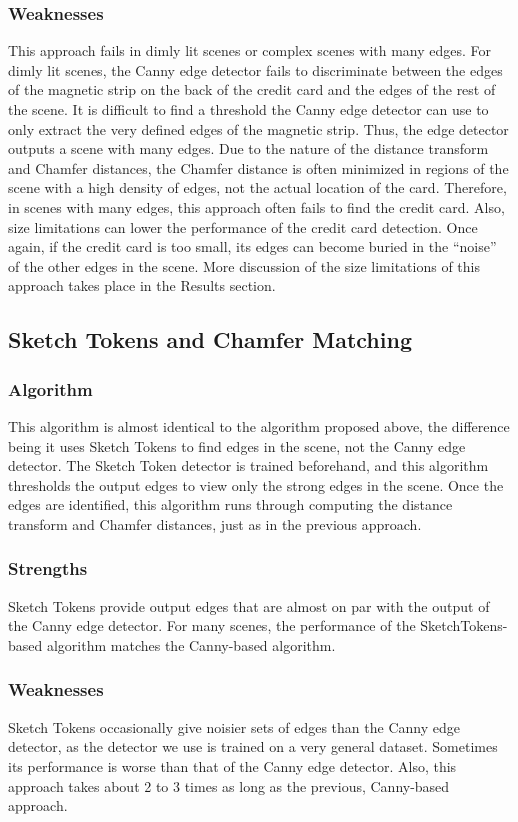 \documentclass[10pt,twocolumn,letterpaper]{article}
\begin{document}
\subsubsection{Weaknesses}
	This approach fails in dimly lit scenes or complex scenes with many edges. For dimly lit scenes, the Canny edge detector fails to discriminate between the edges of the magnetic strip on the back of the credit card and the edges of the rest of the scene. It is difficult to find a threshold the Canny edge detector can use to only extract the very defined edges of the magnetic strip. Thus, the edge detector outputs a scene with many edges. Due to the nature of the distance transform and Chamfer distances, the Chamfer distance is often minimized in regions of the scene with a high density of edges, not the actual location of the card. Therefore, in scenes with many edges, this approach often fails to find the credit card.
Also, size limitations can lower the performance of the credit card detection. Once again, if the credit card is too small, its edges can become buried in the “noise” of the other edges in the scene. More discussion of the size limitations of this approach takes place in the Results section.

\subsection{Sketch Tokens and Chamfer Matching}
\subsubsection{Algorithm}
	This algorithm is almost identical to the algorithm proposed above, the difference being it uses Sketch Tokens to find edges in the scene, not the Canny edge detector. The Sketch Token detector is trained beforehand, and this algorithm thresholds the output edges to view only the strong edges in the scene. Once the edges are identified, this algorithm runs through computing the distance transform and Chamfer distances, just as in the previous approach.
\subsubsection{Strengths}
	Sketch Tokens provide output edges that are almost on par with the output of the Canny edge detector. For many scenes, the performance of the SketchTokens-based algorithm matches the Canny-based algorithm.
\subsubsection{Weaknesses}
	Sketch Tokens occasionally give noisier sets of edges than the Canny edge detector, as the detector we use is trained on a very general dataset. Sometimes its performance is worse than that of the Canny edge detector. Also, this approach takes about 2 to 3 times as long as the previous, Canny-based approach. 
\end{document}
